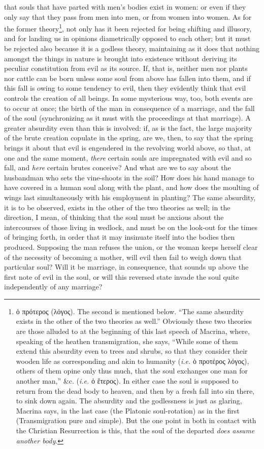 that souls that have parted with men’s bodies exist in women: or even if they only say that they pass from men into men, or from women into women. As for the former theory\footnote{\textgreek{ὁ πρότερος (λόγος}). The second is mentioned below. “The same absurdity exists in the other of the two theories as well.” Obviously these two theories are those alluded to at the beginning of this last speech of Macrina, where, speaking of the heathen transmigration, she says, “While some of them extend this absurdity even to trees and shrubs, so that they consider their wooden life as corresponding and akin to humanity (\emph{i.e.} \textgreek{ὁ προτέρος λόγος}), others of them opine only thus much, that the soul exchanges one man for another man,” \&c. (\emph{i.e.} \textgreek{ὁ ἕτερος}). In either case the soul is supposed to return from the dead body to heaven, and then by a fresh fall into sin there, to sink down again. The absurdity and the godlessness is just as glaring, Macrina says, in the last case (the Platonic soul-rotation) as in the first (Transmigration pure and simple). But the one point in both in contact with the Christian Resurrection is this, that the soul of the departed \emph{does assume another body}.}, not only has it been rejected for being shifting and illusory, and for landing us in opinions diametrically opposed to each other; but it must be rejected also because it is a godless theory, maintaining as it does that nothing amongst the things in nature is brought into existence without deriving its peculiar constitution from evil as its source. If, that is, neither men nor plants nor cattle can be born unless some soul from above has fallen into them, and if this fall is owing to some tendency to evil, then they evidently think that evil controls the creation of all beings. In some mysterious way, too, both events are to occur at once; the birth of the man in consequence of a marriage, and the fall of the soul (synchronizing as it must with the proceedings at that marriage). A greater absurdity even than this is involved: if, as is the fact, the large majority of the brute creation copulate in the spring, are we, then, to say that the spring brings it about that evil is engendered in the revolving world above, so that, at one and the same moment, \emph{there} certain souls are impregnated with evil and so fall, and \emph{here} certain brutes conceive? And what are we to say about the husbandman who sets the vine-shoots in the soil? How does his hand manage to have covered in a human soul along with the plant, and how does the moulting of wings last simultaneously with his employment in planting? The same absurdity, it is to be observed, exists in the other of the two theories as well; in the direction, I mean, of thinking that the soul must be anxious about the intercourses of those living in wedlock, and must be on the look-out for the times of bringing forth, in order that it may insinuate itself into the bodies then produced. Supposing the man refuses the union, or the woman keeps herself clear of the necessity of becoming a mother, will evil then fail to weigh down that particular soul? Will it be marriage, in consequence, that sounds up above the first note of evil in the soul, or will this reversed state invade the soul quite independently of any marriage? 